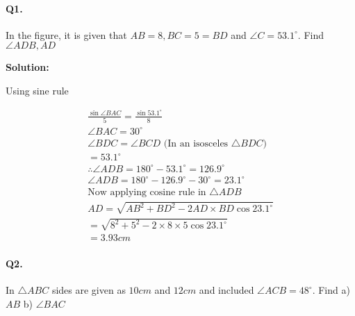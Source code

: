 \documentclass{article}
\begin{document}
\paragraph{Q1.}

In the figure, it is given that $AB=8, BC=5=BD$ and $\angle C=53.1^{\circ}$. Find $\angle ADB, AD$


{\scriptsize \textbf{Solution:}}

Using sine rule

\[
  \begin{aligned}
    \frac{\sin \angle BAC}{5} = \frac{\sin 53.1^{\circ}}{8} \\
    \angle BAC = 30^{\circ} \\
    \angle BDC = \angle BCD \text{ (In an isosceles } \triangle BDC\text{)} \\
    = 53.1^{\circ} \\
    \therefore \angle ADB = 180^{\circ} - 53.1^{\circ} = 126.9^{\circ} \\
    \angle ADB = 180^{\circ} - 126.9^{\circ} - 30^{\circ} = 23.1^{\circ} \\
    \text{Now applying cosine rule in } \triangle ADB \\
    AD = \sqrt{AB^{2}+BD^{2}-2AD \times BD \cos 23.1^{\circ}} \\
    = \sqrt{8^{2}+5^{2}-2 \times 8 \times 5 \cos 23.1^{\circ}} \\
    = 3.93cm
  \end{aligned}
\]

\paragraph{Q2.}

In $\triangle ABC$ sides are given as $10cm$ and $12cm$ and included $\angle ACB=48^{\circ}$. Find a) $AB$ b) $\angle BAC$

\end{document}
